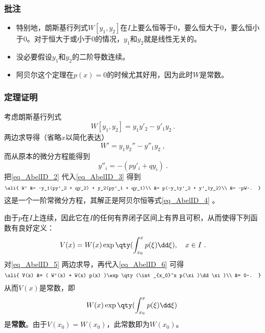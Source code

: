 \subsubsection{批注}

\begin{itemize}
\item 特别地，朗斯基行列式$W[y_1, y_2]$在$I$上要么恒等于$0$，要么恒大于$0$，要么恒小于$0$。对于恒大于或小于$0$的情况，$y_1$和$y_2$就是线性无关的。
\item 没必要假设$y_1$和$y_2$的二阶导数连续。
\item 阿贝尔这个定理在$p(x)=0$的时候尤其好用，因为此时$W$是常数。
\end{itemize}


\subsubsection{定理证明}

考虑朗斯基行列式
\begin{equation}
W[y_1, y_2] = y_1y'_2 - y'_1y_2~.
\end{equation}
两边求导得（省略$x$以简化表达）
\begin{equation}\label{eq_AbelID_3}
W' = y_1y_2'' - y''_1y_2~,
\end{equation}
而从原本的微分方程能得到
\begin{equation}\label{eq_AbelID_2}
y''_i = -(py'_i+qy_i)~.
\end{equation}
把\autoref{eq_AbelID_2} 代入\autoref{eq_AbelID_3} 得到
\begin{equation}\label{eq_AbelID_6}
\ali{
    W' &= -y_1(py'_2 + qy_2) + y_2(py'_1 + qy_1)\\
    &= p(-y_1y'_2 + y'_1y_2)\\
    &= -pW~.
}
\end{equation}
这是一个一阶常微分方程，其解正是阿贝尔恒等式\autoref{eq_AbelID_4} 。

由于$p$在$I$上连续，因此它在$I$的任何有界闭子区间上有界且可积，从而使得下列函数有良好定义：
\begin{equation}\label{eq_AbelID_5}
V(x) = W(x) \exp\qty(\int_{x_0}^x p(\xi)\dd \xi),\quad x\in I~.
\end{equation}
对\autoref{eq_AbelID_5} 两边求导，再代入\autoref{eq_AbelID_6} 可得
\begin{equation}
\ali{
    V(x) &= ( W'(x) + W(x) p(x) )\exp\qty(\int_{x_0}^x p(\xi)\dd \xi)\\
    &= 0~.
}
\end{equation}
从而$V(x)$是常数，即
\begin{equation}
W(x)\exp\qty(\int_{x_0}^x p(\xi)\dd \xi)~
\end{equation}
是\textbf{常数}。由于$V(x_0)=W(x_0)$，此常数即为$W(x_0)$。


